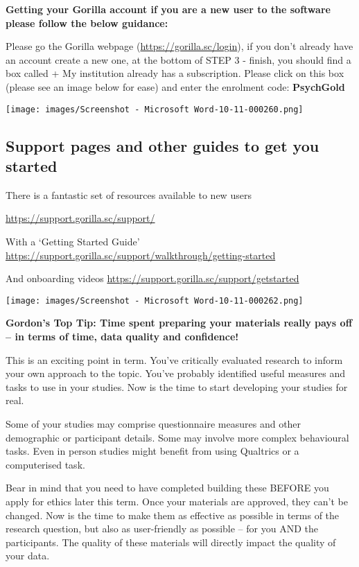 \documentclass[
  letterpaper,
  DIV=11,
  numbers=noendperiod]{scrartcl}
\begin{document}
\textbf{Getting your Gorilla account if you are a new user to the
software please follow the below guidance:}

Please go the Gorilla webpage (\url{https://gorilla.sc/login}), if you
don't already have an account create a new one, at the bottom of STEP 3
- finish, you should find a box called + My institution already has a
subscription. Please click on this box (please see an image below for
ease) and enter the enrolment code: \textbf{PsychGold}

\texttt{[image: images/Screenshot - Microsoft Word-10-11-000260.png]}

\subsection{\texorpdfstring{\textbf{Support pages and other guides to
get you
started}}{Support pages and other guides to get you started}}\label{support-pages-and-other-guides-to-get-you-started}

There is a fantastic set of resources available to new users

\url{https://support.gorilla.sc/support/}

With a `Getting Started Guide'
\url{https://support.gorilla.sc/support/walkthrough/getting-started}

And onboarding videos
\url{https://support.gorilla.sc/support/getstarted}

\texttt{[image: images/Screenshot - Microsoft Word-10-11-000262.png]}

\textbf{Gordon's Top Tip: Time spent preparing your materials really
pays off -- in terms of time, data quality and confidence!}

This is an exciting point in term. You've critically evaluated research
to inform your own approach to the topic. You've probably identified
useful measures and tasks to use in your studies. Now is the time to
start developing your studies for real.

Some of your studies may comprise questionnaire measures and other
demographic or participant details. Some may involve more complex
behavioural tasks. Even in person studies might benefit from using
Qualtrics or a computerised task.

Bear in mind that you need to have completed building these BEFORE you
apply for ethics later this term. Once your materials are approved, they
can't be changed. Now is the time to make them as effective as possible
in terms of the research question, but also as user-friendly as possible
-- for you AND the participants. The quality of these materials will
directly impact the quality of your data.
\end{document}
